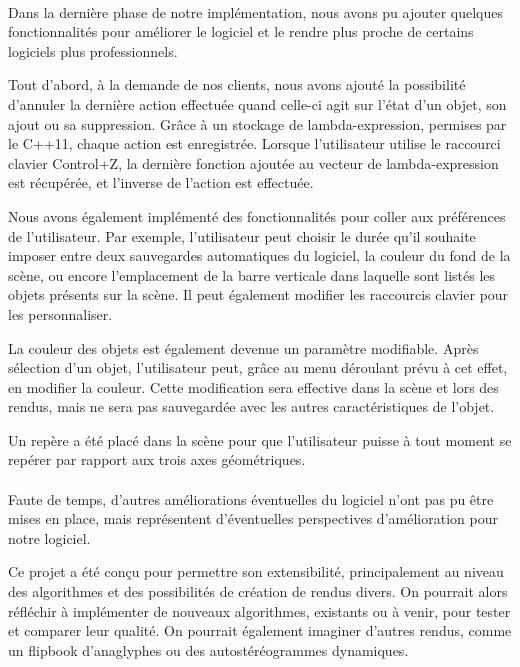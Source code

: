 \paragraph{}
Dans la dernière phase de notre implémentation, nous avons pu ajouter quelques fonctionnalités pour améliorer le logiciel et le rendre plus proche de certains logiciels plus professionnels.

Tout d'abord, à la demande de nos clients, nous avons ajouté la possibilité d'annuler la dernière action effectuée quand celle-ci agit sur l'état d'un objet, son ajout ou sa suppression. Grâce à un stockage de lambda-expression, permises par le C++11, chaque action est enregistrée. Lorsque l'utilisateur utilise le raccourci clavier Control+Z, la dernière fonction ajoutée au vecteur de lambda-expression est récupérée, et l'inverse de l'action est effectuée.

Nous avons également implémenté des fonctionnalités pour coller aux préférences de l'utilisateur. Par exemple, l'utilisateur peut choisir le durée qu'il souhaite imposer entre deux sauvegardes automatiques du logiciel, la couleur du fond de la scène, ou encore l'emplacement de la barre verticale dans laquelle sont listés les objets présents sur la scène. Il peut également modifier les raccourcis clavier pour les personnaliser.

La couleur des objets est également devenue un paramètre modifiable. Après sélection d'un objet, l'utilisateur peut, grâce au menu déroulant prévu à cet effet, en modifier la couleur. Cette modification sera effective dans la scène et lors des rendus, mais ne sera pas sauvegardée avec les autres caractéristiques de l'objet.

Un repère a été placé dans la scène pour que l'utilisateur puisse à tout moment se repérer par rapport aux trois axes géométriques.




\paragraph{}
Faute de temps, d'autres améliorations éventuelles du logiciel n'ont pas pu être mises en place, mais représentent d'éventuelles perspectives d'amélioration pour notre logiciel.

Ce projet a été conçu pour permettre son extensibilité, principalement au niveau des algorithmes et des possibilités de création de rendus divers. On pourrait alors réfléchir à implémenter de nouveaux algorithmes, existants ou à venir, pour tester et comparer leur qualité. On pourrait également imaginer d'autres rendus, comme un flipbook d'anaglyphes ou des autostéréogrammes dynamiques.


